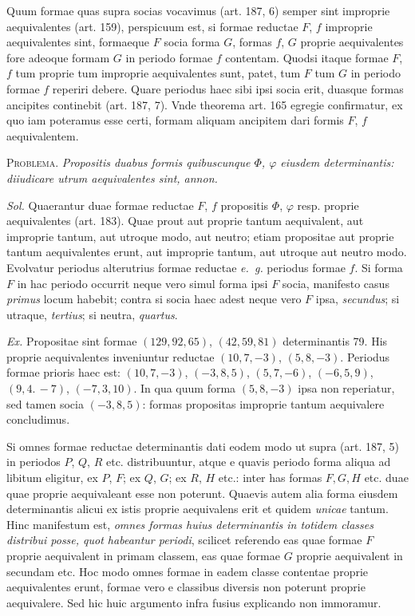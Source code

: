 Quum formae quas supra socias vocavimus (art. 187, 6) semper sint improprie aequivalentes (art. 159), perspicuum est, si formae reductae $F$, $f$ improprie aequivalentes sint, formaeque $F$ socia forma $G$, formas $f$, $G$ proprie aequivalentes fore adeoque formam $G$ in periodo formae $f$ contentam. Quodsi itaque formae $F$, $f$ tum proprie tum improprie aequivalentes sunt, patet, tum $F$ tum $G$ in periodo formae $f$ reperiri debere. Quare periodus haec sibi ipsi socia erit, duasque formas ancipites continebit (art. 187, 7). Vnde theorema art. 165 egregie confirmatur, ex quo iam poteramus esse certi, formam aliquam ancipitem dari formis $F$, $f$ aequivalentem.

\textsc{Problema.} \textit{Propositis duabus formis quibuscunque $\Phi$, $\varphi$ eiusdem determinantis: diiudicare utrum aequivalentes sint, annon.}

\textit{Sol.} Quaerantur duae formae reductae $F$, $f$ propositis $\Phi$, $\varphi$ resp. proprie aequivalentes (art. 183). Quae prout aut proprie tantum aequivalent, aut improprie tantum, aut utroque modo, aut neutro; etiam propositae aut proprie tantum aequivalentes erunt, aut improprie tantum, aut utroque aut neutro modo. Evolvatur periodus alterutrius formae reductae \textit{e. g.} periodus formae $f$. Si forma $F$ in hac periodo occurrit neque vero simul forma ipsi $F$ socia, manifesto casus \textit{primus} locum habebit; contra si socia haec adest neque vero $F$ ipsa, \textit{secundus}; si utraque, \textit{tertius}; si neutra, \textit{quartus}.

\textit{Ex.} Propositae sint formae $(129,92,65)$, $(42,59,81)$ determinantis 79. His proprie aequivalentes inveniuntur reductae $(10,7,-3)$, $(5,8,-3)$. Periodus formae prioris haec est: $(10,7,-3)$, $(-3,8,5)$, $(5,7,-6)$, $(-6,5,9)$, $(9,4.\,-7)$, $(-7,3,10)$. In qua quum forma $(5,8,-3)$ ipsa non reperiatur,
sed tamen socia $(-3,8,5)$: formas propositas improprie tantum aequivalere concludimus.

Si omnes formae reductae determinantis dati eodem modo ut supra (art. 187, 5) in periodos $P$, $Q$, $R$ etc. distribuuntur, atque e quavis periodo forma aliqua ad libitum eligitur, ex $P$, $F$; ex $Q$, $G$; ex $R$, $H$ etc.: inter has formas $F,G,H$ etc. duae quae proprie aequivaleant esse non poterunt. Quaevis autem alia forma eiusdem determinantis alicui ex istis proprie aequivalens erit et quidem \textit{unicae} tantum. Hinc manifestum est, \textit{omnes formas huius determinantis in totidem classes distribui posse, quot habeantur periodi}, scilicet referendo eas quae formae $F$ proprie aequivalent in primam classem, eas quae formae $G$ proprie aequivalent in secundam etc. Hoc modo omnes formae in eadem classe contentae proprie aequivalentes erunt, formae vero e classibus diversis non poterunt proprie aequivalere. Sed hic huic argumento infra fusius explicando non immoramur.

